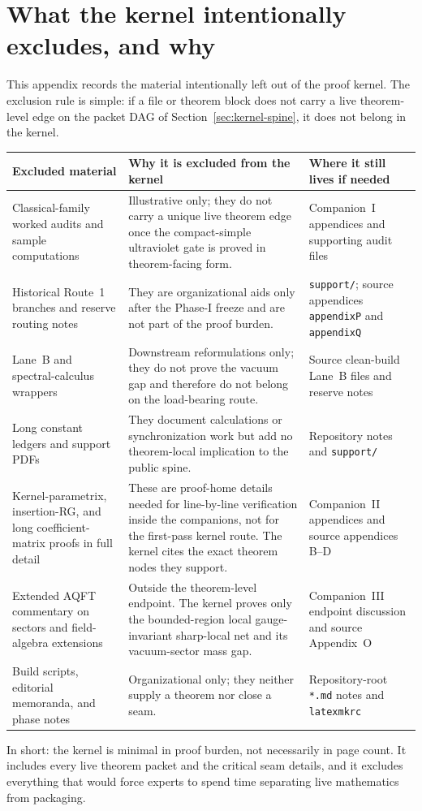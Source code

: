 \section{What the kernel intentionally excludes, and why}\label{app:kernel-exclusions}

This appendix records the material intentionally left out of the proof kernel. The exclusion rule is simple: if a file or theorem block does not carry a live theorem-level edge on the packet DAG of Section~\ref{sec:kernel-spine}, it does not belong in the kernel.

\begin{center}
\small
\setlength{\tabcolsep}{4pt}
\renewcommand{\arraystretch}{1.1}
\begin{tabular}{@{}p{3.1cm}p{5.8cm}p{3.4cm}@{}}
\toprule
\textbf{Excluded material} & \textbf{Why it is excluded from the kernel} & \textbf{Where it still lives if needed} \\
\midrule
Classical-family worked audits and sample computations & Illustrative only; they do not carry a unique live theorem edge once the compact-simple ultraviolet gate is proved in theorem-facing form. & Companion~I appendices and supporting audit files \\
Historical Route~1 branches and reserve routing notes & They are organizational aids only after the Phase-I freeze and are not part of the proof burden. & \texttt{support/}; source appendices \texttt{appendixP} and \texttt{appendixQ} \\
Lane~B and spectral-calculus wrappers & Downstream reformulations only; they do not prove the vacuum gap and therefore do not belong on the load-bearing route. & Source clean-build Lane~B files and reserve notes \\
Long constant ledgers and support PDFs & They document calculations or synchronization work but add no theorem-local implication to the public spine. & Repository notes and \texttt{support/} \\
Kernel-parametrix, insertion-RG, and long coefficient-matrix proofs in full detail & These are proof-home details needed for line-by-line verification inside the companions, not for the first-pass kernel route. The kernel cites the exact theorem nodes they support. & Companion~II appendices and source appendices B--D \\
Extended AQFT commentary on sectors and field-algebra extensions & Outside the theorem-level endpoint. The kernel proves only the bounded-region local gauge-invariant sharp-local net and its vacuum-sector mass gap. & Companion~III endpoint discussion and source Appendix~O \\
Build scripts, editorial memoranda, and phase notes & Organizational only; they neither supply a theorem nor close a seam. & Repository-root \texttt{*.md} notes and \texttt{latexmkrc} \\
\bottomrule
\end{tabular}
\end{center}

In short: the kernel is minimal in proof burden, not necessarily in page count. It includes every live theorem packet and the critical seam details, and it excludes everything that would force experts to spend time separating live mathematics from packaging.
